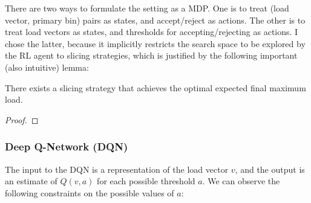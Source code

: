 There are two ways to formulate the \TwoThinning setting as a MDP. One is to treat (load vector, primary bin) pairs as states, and accept/reject as actions. The other is to treat load vectors as states, and thresholds for accepting/rejecting as actions. I chose the latter, because it implicitly restricts the search space to be explored by the RL agent to slicing strategies, which is justified by the following important (also intuitive) lemma:


\begin{lemma} \label{lemma: thresholdproperty}
There exists a slicing strategy that achieves the optimal expected final maximum load.
\end{lemma}


\begin{proof}
\end{proof}



\subsubsection{Deep Q-Network (DQN)} \label{DQN}

The input to the DQN is a representation of the load vector $v$, and the output is an estimate of $Q(v, a)$ for each possible threshold $a$. We can observe the following constraints on the possible values of $a$:

